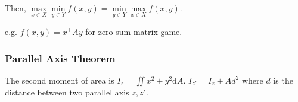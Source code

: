 Then,
$
\max\limits _{x\in X}\min\limits _{y\in Y}f(x,y)=\min\limits _{y\in Y}\max\limits _{x\in X}f(x,y)
$.

e.g. $f(x, y) = x^\intercal A y$ for zero-sum matrix game.

\subsubsection{Parallel Axis Theorem}
The second moment of area is $I_z = \iint x^2+y^2 \mathrm{d}A$.
$I_{z'} = I_z + Ad^2$ where $d$ is the distance between two parallel axis $z, z'$.
